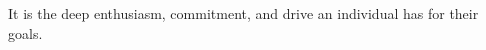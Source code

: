 \documentclass[preview]{standalone}
\begin{document}
\begin{center}
It is the deep enthusiasm, commitment, and drive an individual has for their goals.
\end{center}
\end{document}
